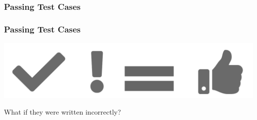 \subsubsection{Passing Test Cases}
%
%
\begin{frame}
	\frametitle{Passing Test Cases}
	\begin{center}
		\includegraphics[scale = .35]{images/passingEquals.png}
	\end{center}
	\begin{center}
		What if they were written incorrectly?
	\end{center}
\end{frame}

